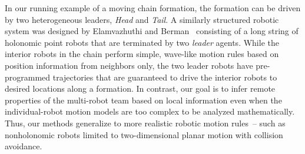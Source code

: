 \documentclass[letterpaper, 10 pt, conference]{ieeeconf}  %
\begin{document}
	In our running example of a moving chain formation, the formation can be
	driven by two heterogeneous leaders, \emph{Head} and \emph{Tail}. A
	similarly structured robotic system was designed by Elamvazhuthi and
	Berman~\cite{EB16} consisting of a long string of holonomic point robots
	that are terminated by two \emph{leader} agents. While the interior
	robots in the chain perform simple, wave-like motion rules based on
	position information from neighbors only, the two leader robots have
	pre-programmed trajectories that are guaranteed to drive the interior
	robots to desired locations along a formation. In contrast, our goal is
	to infer remote properties of the multi-robot team based on local
	information even when the individual-robot motion models are too complex
	to be analyzed mathematically. Thus, our methods generalize to more
	realistic robotic motion rules~-- such as nonholonomic robots limited to
	two-dimensional planar motion with collision avoidance.
	
\end{document}
